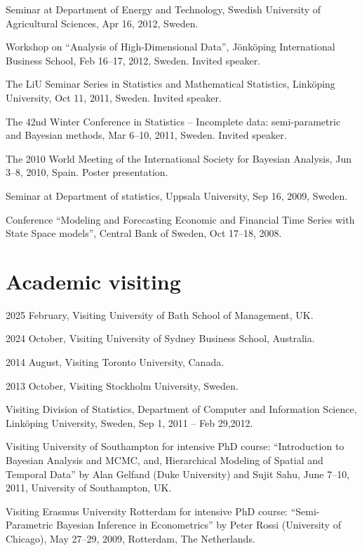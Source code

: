 \documentclass[twoside,a4paper]{article}
\begin{document}
\begin{etaremune}[itemsep=0ex,parsep=0pt]
\item Seminar at Department of Energy and Technology, Swedish University of Agricultural Sciences, Apr 16, 2012, Sweden.

\item Workshop on ``Analysis of High-Dimensional Data'', Jönköping International Business School, Feb 16--17, 2012, Sweden. Invited speaker.

\item The LiU Seminar Series in Statistics and Mathematical Statistics, Linköping University, Oct 11, 2011, Sweden. Invited speaker.

\item The 42nd Winter Conference in Statistics -- Incomplete data: semi-parametric and Bayesian methods, Mar 6--10, 2011, Sweden. Invited speaker.

\item The 2010 World Meeting of the International Society for Bayesian Analysis, Jun 3--8, 2010, Spain. Poster presentation.

\item Seminar at Department of statistics, Uppsala University, Sep 16, 2009, Sweden.

\item Conference ``Modeling and Forecasting Economic and Financial Time Series with State Space models'', Central Bank of Sweden, Oct 17--18, 2008.

\end{etaremune}

\section{Academic visiting}
\begin{etaremune}[itemsep=0ex,parsep=0pt]
\item 2025 February, Visiting University of Bath School of Management, UK.
\item 2024 October,  Visiting University of Sydney Business School, Australia.
\item 2014 August,  Visiting Toronto University, Canada.
\item 2013 October,  Visiting Stockholm University, Sweden.
\item Visiting Division of Statistics, Department of Computer and Information Science, Linköping University, Sweden, Sep 1, 2011 -- Feb 29,2012.
\item Visiting University of Southampton for intensive PhD course: ``Introduction to Bayesian Analysis and MCMC, and, Hierarchical Modeling of Spatial and Temporal Data'' by Alan Gelfand (Duke University) and Sujit Sahu, June 7--10, 2011, University of Southampton, UK.
\item Visiting Erasmus University Rotterdam for intensive PhD course: ``Semi-Parametric Bayesian Inference in Econometrics'' by Peter Rossi (University of Chicago), May 27--29, 2009, Rotterdam, The Netherlands.

\end{etaremune}
\end{document}
